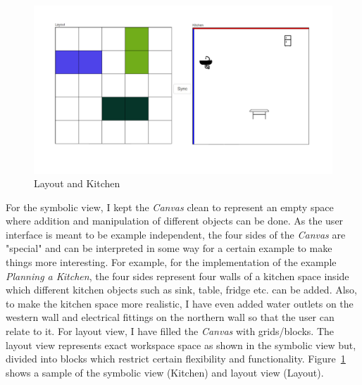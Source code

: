 \begin{figure}[h]
	\centering
	\includegraphics[width=1\textwidth]{figures/Layout_Kitchen}
	\caption{Layout and Kitchen}
	\label{fig:Layout_Kitchen}
\end{figure}

For the symbolic view, I kept the \textit{Canvas} clean to represent an empty space where addition and manipulation of different objects can be done. As the user interface is meant to be example independent, the four sides of the \textit{Canvas} are "special" and can be interpreted in some way for a certain example to make things more interesting. For example, for the implementation of the example \textit{Planning a Kitchen}, the four sides represent four walls of a kitchen space inside which different kitchen objects such as sink, table, fridge etc. can be added. Also, to make the kitchen space more realistic, I have even added {\color{blue} water outlets} on the western wall and {\color{red} electrical fittings} on the northern wall so that the user can relate to it. For layout view, I have filled the \textit{Canvas} with grids/blocks. The layout view represents exact workspace space as shown in the symbolic view but, divided into blocks which restrict certain flexibility and functionality. Figure~\ref{fig:Layout_Kitchen} shows a sample of the symbolic view (Kitchen) and layout view (Layout).

